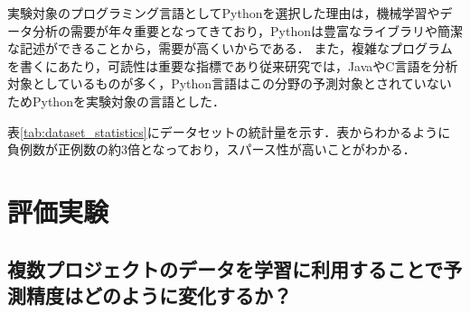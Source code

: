 \documentclass[paper]{ieicej}
\begin{document}
実験対象のプログラミング言語としてPythonを選択した理由は，機械学習やデータ分析の需要が年々重要となってきており，Pythonは豊富なライブラリや簡潔な記述ができることから，需要が高くいからである．
また，複雑なプログラムを書くにあたり，可読性は重要な指標であり従来研究では，JavaやC言語を分析対象としているものが多く，Python言語はこの分野の予測対象とされていないためPythonを実験対象の言語とした．

表\ref{tab:dataset_statistics}にデータセットの統計量を示す．表からわかるように負例数が正例数の約3倍となっており，スパース性が高いことがわかる．

\section{評価実験}\label{chap:result}



\subsection{複数プロジェクトのデータを学習に利用することで予測精度はどのように変化するか？}
\end{document}
